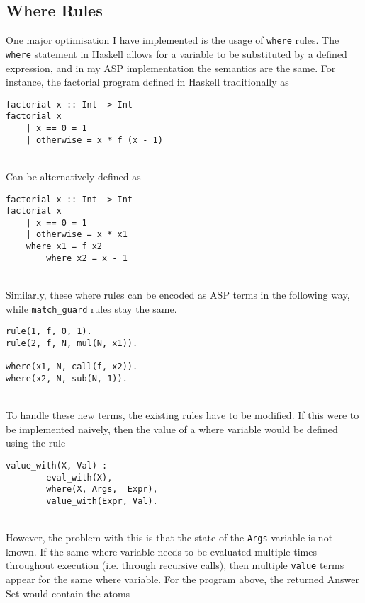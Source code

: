 \subsection{Where Rules}
One major optimisation I have implemented is the usage of \lstinline!where! rules. The \lstinline!where! statement in Haskell allows for a variable to be substituted by a defined expression, and in my ASP implementation the semantics are the same. For instance, the factorial program defined in Haskell traditionally as \\

\begin{lstlisting}
factorial x :: Int -> Int
factorial x 
	| x == 0 = 1
	| otherwise = x * f (x - 1)
\end{lstlisting}
\mbox{}\\
Can be alternatively defined as \\

\begin{lstlisting}
factorial x :: Int -> Int
factorial x 
	| x == 0 = 1
	| otherwise = x * x1
	where x1 = f x2
		where x2 = x - 1
\end{lstlisting}
\mbox{}\\
Similarly, these where rules can be encoded as ASP terms in the following way, while \lstinline!match_guard! rules stay the same.\\

\begin{lstlisting}
rule(1, f, 0, 1).
rule(2, f, N, mul(N, x1)).

where(x1, N, call(f, x2)).
where(x2, N, sub(N, 1)).
\end{lstlisting}
\mbox{}\\
To handle these new terms, the existing rules have to be modified. If this were to be implemented naively, then the value of a where variable would be defined using the rule \\

\begin{lstlisting}
value_with(X, Val) :- 
		eval_with(X), 
		where(X, Args,  Expr), 
		value_with(Expr, Val).
\end{lstlisting}
\mbox{}\\
However, the problem with this is that the state of the \lstinline!Args! variable is not known. If the same where variable needs to be evaluated multiple times throughout execution (i.e. through recursive calls), then multiple \lstinline!value! terms appear for the same where variable. For the program above, the returned Answer Set would contain the atoms \\

